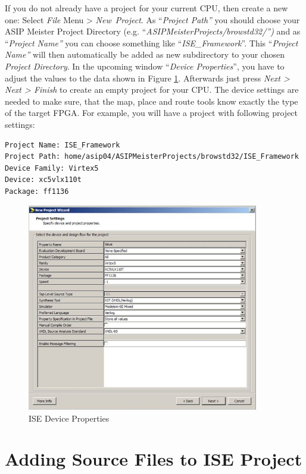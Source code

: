 If you do not already have a project for your current CPU, then create a
new one: Select \emph{File} Menu \textgreater{} \emph{New~Project}. As
``\emph{Project Path''} you should choose your ASIP Meister Project
Directory (e.g. ``\emph{ASIPMeisterProjects/browstd32/'')} and as
``\emph{Project Name''} you can choose something like
``\emph{ISE\_Framework}''. This ``\emph{Project Name''} will then
automatically be added as new subdirectory to your chosen \emph{Project
Directory}. In the upcoming window ``\emph{Device Properties}'', you
have to adjust the values to the data shown in Figure \ref{fig:fig62}. Afterwards just press \emph{Next
\textgreater{} Next \textgreater{} Finish} to create an empty project
for your CPU. The device settings are needed to make sure, that the map,
place and route tools know exactly the type of the target FPGA. For
example, you will have a project with following project settings:
\begin{lstlisting}
Project Name: ISE_Framework
Project Path: home/asip04/ASIPMeisterProjects/browstd32/ISE_Framework
Device Family: Virtex5
Device: xc5vlx110t
Package: ff1136
\end{lstlisting}
\begin{figure}[!htb]
	\centering
	\includegraphics[width=0.9\textwidth]{src/images/6-2.png}
	\caption{ISE Device Properties}
	\label{fig:fig62}
\end{figure}
\hypertarget{adding-source-files-to-ise-project}{%
\section{Adding Source Files to ISE
Project}\label{adding-source-files-to-ise-project}}

